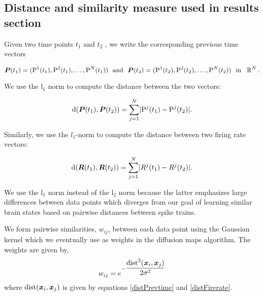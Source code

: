 \subsection{Distance  and similarity measure used in results section}
Given two time points $t_{1}$ and $t_{2}$ , we write the corresponding previous time vectors 

$$ \vect{P}(t_1)= (\text{P}^{1}(t_{1}), \text{P}^{2}(t_{1}), \ldots, \text{P}^{N}(t_{1}))   \  \ \text{and} \  \ 
 \vect{P}(t_{2}) = (\text{P}^{1}(t_{2}), \text{P}^{2}(t_{2}), \ldots, \text{P}^{N}(t_{2}))  \  \ \text{in} \  \  \R^{N}.$$

We use the l$_{1}$ norm to compute the distance between the two vectors:

\begin{equation}\label{distPrevtime}
\text{d}(\boldsymbol{P}(t_{1}), \boldsymbol{P}(t_{2}) ) = 
\displaystyle \sum_{j=1}^{N} \lvert \text{P}^{j}(t_{1}) - \text{P}^{j}(t_{2})   \rvert.
\end{equation}

Similarly, we use the $l_{1}$-norm to compute the distance between two firing rate vectors:

\begin{equation}\label{distFirerate}
\text{d}(\boldsymbol{R}(t_{1}), \boldsymbol{R}(t_{2}) ) = 
\displaystyle \sum_{j=1}^{N} \lvert R^{j}(t_{1}) - R^{j}(t_{2})   \rvert.
\end{equation}

We use the  l$_1$ norm  instead of the l$_{2}$ norm because the latter emphasizes large differences between data points which diverges from our goal of learning similar brain states  based on pairwise distances between spike trains.


We form pairwise similarities, $w_{ij}$, between each data point using the Gaussian kernel  which we eventually use as weights in the diffusion maps algorithm. The weights are given by,
\[
w_{ij} = e^{-\dfrac{\text{dist}^{2}(\boldsymbol{x}_{i}, \boldsymbol{x}_{j})}{2\sigma^2}} 
\]   where $\text{dist}(\boldsymbol{x}_{i}, \boldsymbol{x}_{j})$ is given by equations
\eqref{distPrevtime} and \eqref{distFirerate}. 
























